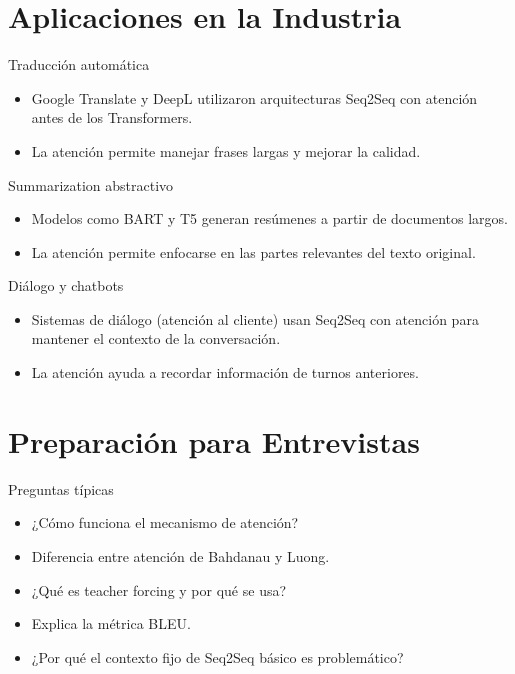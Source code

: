 \documentclass[aspectratio=169, 10pt, xcolor=table]{beamer}
\begin{document}
\section{Aplicaciones en la Industria}

\begin{frame}{Traducción automática}
    \begin{itemize}
        \item Google Translate y DeepL utilizaron arquitecturas Seq2Seq con atención antes de los Transformers.
        \item La atención permite manejar frases largas y mejorar la calidad.
    \end{itemize}
\end{frame}

\begin{frame}{Summarization abstractivo}
    \begin{itemize}
        \item Modelos como BART y T5 generan resúmenes a partir de documentos largos.
        \item La atención permite enfocarse en las partes relevantes del texto original.
    \end{itemize}
\end{frame}

\begin{frame}{Diálogo y chatbots}
    \begin{itemize}
        \item Sistemas de diálogo (atención al cliente) usan Seq2Seq con atención para mantener el contexto de la conversación.
        \item La atención ayuda a recordar información de turnos anteriores.
    \end{itemize}
\end{frame}

\section{Preparación para Entrevistas}

\begin{frame}{Preguntas típicas}
    \begin{itemize}
        \item ¿Cómo funciona el mecanismo de atención?
        \item Diferencia entre atención de Bahdanau y Luong.
        \item ¿Qué es teacher forcing y por qué se usa?
        \item Explica la métrica BLEU.
        \item ¿Por qué el contexto fijo de Seq2Seq básico es problemático?
    \end{itemize}
\end{frame}
\end{document}
